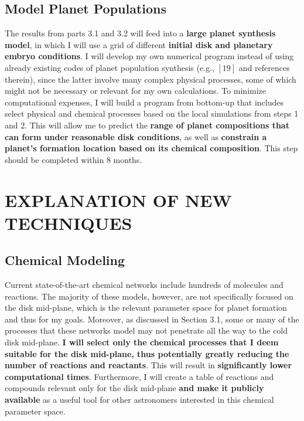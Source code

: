 \documentclass[12pt, letterpaper]{article}
\begin{document}

\subsection{Model Planet Populations} 

The results from parts 3.1 and 3.2 will feed into a \textbf{large planet synthesis model}, in which I will use a grid of different \textbf{initial disk and planetary embryo conditions}. I will develop my own numerical program instead of using already existing codes of planet population synthesis (e.g., $[19]$ and references therein), since the latter involve many complex physical processes, some of which might not be necessary or relevant for my own calculations. To minimize computational expenses, I will build a program from bottom-up that includes select physical and chemical processes based on the local simulations from steps 1 and 2. This will allow me to predict the \textbf{range of planet compositions that can form under reasonable disk conditions}, as well as \textbf{constrain a planet's formation location based on its chemical composition}. %
This step should be completed within 8 months.


\section{EXPLANATION OF NEW TECHNIQUES}


\subsection{Chemical Modeling}

Current state-of-the-art chemical networks include hundreds of molecules and reactions. The majority of these models, however, are not specifically focused on the disk mid-plane, which is the relevant parameter space for planet formation and thus for my goals. Moreover, as discussed in Section 3.1, some or many of the processes that these networks model may not penetrate all the way to the cold disk mid-plane. \textbf{I will select only the chemical processes that I deem suitable for the disk mid-plane, thus potentially greatly reducing the number of reactions and reactants}. This will result in \textbf{significantly lower computational times}. Furthermore, I will create a table of reactions and compounds relevant only for the disk mid-plane \textbf{and make it publicly available} as a useful tool for other astronomers interested in this chemical parameter space. 
\end{document}
